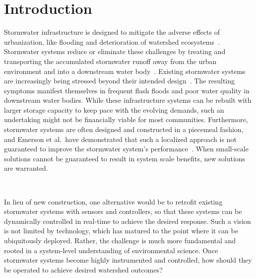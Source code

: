 \chapter{Introduction}\label{ch:introduction}
Stormwater infrastructure is designed to mitigate the adverse effects of urbanization, like flooding and deterioration of watershed ecosystems~\cite{national2009urban, randhir2009urbanization}.
Stormwater systems reduce or eliminate these challenges by treating and transporting the accumulated stormwater runoff away from the urban environment and into a downstream water body~\cite{national2009urban}.
Existing stormwater systems are increasingly being stressed beyond their intended design~\cite{kerkez2016, national2009urban}.
The resulting symptoms manifest themselves in frequent flash floods\cite{LarisKarklisBefore-and-afterPost} and poor water quality in downstream water bodies\cite{Watson2016TheHypoxia}.
While these infrastructure systems can be rebuilt with larger storage capacity to keep pace with the evolving demands, such an undertaking might not be financially viable for most communities\cite{kerkez2016}.
Furthermore, stormwater systems are often designed and constructed in a piecemeal fashion, and Emerson et al.\ have demonstrated that such a localized approach is not guaranteed to improve the stormwater system's performance~\cite{Emerson2005Watershed-ScaleBasins}.
When small-scale solutions cannot be guaranteed to result in system scale benefits,  new solutions are warranted.

\

In lieu of new construction, one alternative would be to retrofit existing stormwater systems with sensors and controllers, so that these systems can be dynamically controlled in real-time to achieve the desired response\cite{kerkez2016, Mullapudi_Wong_Kerkez_2017}.
Such a vision is not limited by technology, which has matured to the point where it can be ubiquitously deployed\cite{Bartos_2018}.
Rather, the challenge is much more fundamental and rooted in a system-level understanding of environmental science.
Once stormwater systems become highly instrumented and controlled, how should they be operated to achieve desired watershed outcomes?

